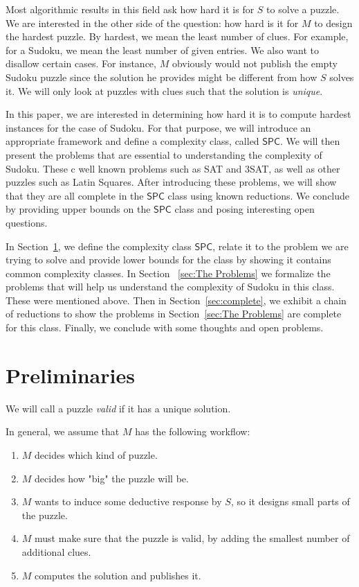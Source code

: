 \documentclass[runningheads,a4paper]{llncs}
\begin{document}
Most algorithmic results in this field ask how hard it is for $S$ to solve a puzzle. We are interested in the other side of the question: how hard is it for $M$ to design the hardest puzzle. By hardest, we mean the least number of clues. For example, for a Sudoku, we mean the least number of given entries. We also want to disallow certain cases. For instance, $M$ obviously would not publish the empty Sudoku puzzle since the solution he provides might be different from how $S$ solves it. We will only look at puzzles with clues such that the solution is \emph{unique}.

In this paper, we are interested in determining how hard it is to compute hardest instances for the case of Sudoku. For that purpose, we will introduce an appropriate framework and define a complexity class, called $\mathsf{SPC}$. We will then present the problems that are essential to understanding the complexity of Sudoku. These c well known problems such as SAT and 3SAT, as well as other puzzles such as Latin Squares. After introducing these problems, we will show that they are all complete in the $\mathsf{SPC}$ class using known reductions. We conclude by providing upper bounds on the $\mathsf{SPC}$ class and posing interesting open questions. 

In Section~\ref{sec:prelim}, we define the complexity class $\mathsf{SPC}$, relate it to the problem we are trying to solve and provide lower bounds for the class by showing it contains common complexity classes. In Section ~\ref{sec:The Problems} we formalize the problems that will help us understand the complexity of Sudoku in this class. These were mentioned above. Then in Section~\ref{sec:complete}, we exhibit a chain of reductions to show the problems in Section~\ref{sec:The Problems} are complete for this class. Finally, we conclude with some thoughts and open problems.

\section{Preliminaries}
\label{sec:prelim}

\begin{definition}
We will call a puzzle \emph{valid} if it has a unique solution.
\end{definition}

In general, we assume that $M$ has the following workflow:
\begin{enumerate}
\item $M$ decides which kind of puzzle.
\item $M$ decides how "big" the puzzle will be.
\item $M$ wants to induce some deductive response by $S$, so it designs small parts of the puzzle.
\item $M$ must make sure that the puzzle is valid, by adding the smallest number of additional clues.
\item $M$ computes the solution and publishes it. 
\end{enumerate}
\end{document}
